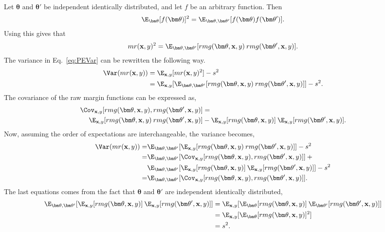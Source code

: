 Let $\bm \theta$ and $\bm \theta'$ be independent identically distributed, and let $f$ be an arbitrary function. Then
\begin{align}
  \E_{\bm \theta}[f(\bm \theta)]^2 = \E_{\bm \theta, \bm \theta'}[f(\bm \theta) f(\bm \theta')]. 
\end{align}
Using this gives that 
\begin{align}
  mr(\mathbf{x}, y)^2  = \E_{\bm \theta, \bm \theta'}[rmg(\bm \theta, \mathbf{x}, y) \: rmg(\bm \theta', \mathbf{x}, y)]. 
\end{align}
The variance in Eq.~\eqref{eq:PEVar} can be rewritten the following way.
\begin{align}
  \Var(mr(\mathbf{x}, y)) 
  &= \E_{\mathbf{x}, y}[mr(\mathbf{x}, y)^2] - s^2 \notag \\
  &= \E_{\mathbf{x}, y}[ \E_{\bm \theta, \bm \theta'}[rmg(\bm \theta, \mathbf{x}, y) \: rmg(\bm \theta', \mathbf{x}, y)]] - s^2.
\end{align}
The covariance of the raw margin functions can be expressed as,
\begin{align}
  \Cov_{\mathbf{x}, y} [rmg(\bm \theta, \mathbf{x}, y), rmg(\bm \theta', \mathbf{x}, y)] &= \notag \\
  \E_{\mathbf{x}, y} [rmg(\bm \theta, \mathbf{x}, y) \: rmg(\bm \theta', \mathbf{x}, y)] &-
  \E_{\mathbf{x}, y} [rmg(\bm \theta, \mathbf{x}, y)]\: \E_{\mathbf{x}, y} [rmg(\bm \theta', \mathbf{x}, y)].
\end{align}
Now, assuming the order of expectations are interchangeable, the variance becomes,
\begin{align}
  \Var(mr(\mathbf{x}, y)) 
  = &\E_{\bm \theta, \bm \theta'}[\E_{\mathbf{x}, y}[ rmg(\bm \theta, \mathbf{x}, y) \: rmg(\bm \theta', \mathbf{x}, y)]] - s^2 \notag \\
  = &\E_{\bm \theta, \bm \theta'}[\Cov_{\mathbf{x}, y} [rmg(\bm \theta, \mathbf{x}, y), rmg(\bm \theta', \mathbf{x}, y)]] \: +\notag \\
    &\E_{\bm \theta, \bm \theta'} [\E_{\mathbf{x}, y} [rmg(\bm \theta, \mathbf{x}, y)]\: \E_{\mathbf{x}, y} [rmg(\bm \theta', \mathbf{x}, y)]]
  - s^2 \notag \\
  \label{eq:VarCovRF} 
  = &\E_{\bm \theta, \bm \theta'}[\Cov_{\mathbf{x}, y} [rmg(\bm \theta, \mathbf{x}, y), rmg(\bm \theta', \mathbf{x}, y)]].
\end{align}
The last equations comes from the fact that $\bm \theta$ and $\bm \theta'$ are independent identically distributed,
\begin{align}
  \E_{\bm \theta, \bm \theta'} [\E_{\mathbf{x}, y} [rmg(\bm \theta, \mathbf{x}, y)]\: \E_{\mathbf{x}, y} [rmg(\bm \theta', \mathbf{x}, y)]] 
  &= \E_{\mathbf{x}, y} [\E_{\bm \theta} [rmg(\bm \theta, \mathbf{x}, y)] \: \E_{\bm \theta'}[rmg(\bm \theta', \mathbf{x}, y)]] \notag \\
  &= \E_{\mathbf{x}, y} [\E_{\bm \theta} [rmg(\bm \theta, \mathbf{x}, y)]^2]  \notag \\
  &= s^2.
\end{align}
